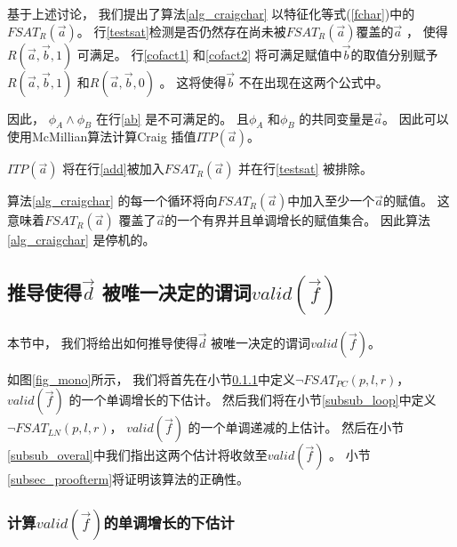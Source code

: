 基于上述讨论，
我们提出了算法\ref{alg_craigchar} 以特征化等式(\ref{fchar})中的$FSAT_R(\vec{a})$。
行\ref{testsat}检测是否仍然存在尚未被$FSAT_R(\vec{a})$覆盖的$\vec{a}$ ，
使得$R(\vec{a},\vec{b},1)$ 可满足。
行\ref{cofact1} 和\ref{cofact2} 将可满足赋值中$\vec{b}$的取值分别赋予
$R(\vec{a},\vec{b},1)$ 和$R(\vec{a},\vec{b},0)$ 。
这将使得$\vec{b}$ 不在出现在这两个公式中。

因此，
$\phi_A\wedge \phi_B$ 在行\ref{ab} 是不可满足的。
且$\phi_A$ 和$\phi_B$ 的共同变量是$\vec{a}$。
因此可以使用McMillian算法计算Craig 插值$ITP(\vec{a})$。

$ITP(\vec{a})$ 将在行\ref{add}被加入$FSAT_R(\vec{a})$  并在行\ref{testsat} 被排除。

算法\ref{alg_craigchar} 的每一个循环将向$FSAT_R(\vec{a})$中加入至少一个$\vec{a}$的赋值。
这意味着$FSAT_R(\vec{a})$ 覆盖了$\vec{a}$的一个有界并且单调增长的赋值集合。
因此算法\ref{alg_craigchar} 是停机的。

\subsection{推导使得$\vec{d}$ 被唯一决定的谓词$valid(\vec{f})$}\label{subsec_infer}


本节中，
我们将给出如何推导使得$\vec{d}$ 被唯一决定的谓词$valid(\vec{f})$。


如图\ref{fig_mono}所示，
我们将首先在小节\ref{subsub_nonloop}中定义$\neg FSAT_{PC}(p,l,r)$，
$valid(\vec{f})$ 的一个单调增长的下估计。
然后我们将在小节\ref{subsub_loop}中定义$\neg FSAT_{LN}(p,l,r)$，
$valid(\vec{f})$ 的一个单调递减的上估计。
然后在小节\ref{subsub_overal}中我们指出这两个估计将收敛至$valid(\vec{f})$ 。
小节\ref{subsec_proofterm}将证明该算法的正确性。


\subsubsection{\textbf{计算$valid(\vec{f})$的单调增长的下估计}}\label{subsub_nonloop}

